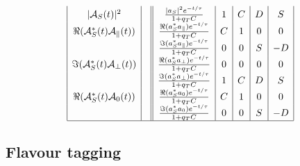 \documentclass[a4paper,9pt,twosided]{article}
\begin{document}
\begin{equation}
\begin{array}{| c |c|| c | c | c | c | c |}
|{\cal A}_S(t)|^2                             &                                                                &\frac{  | a_S |^2 e^{-t/\tau}}{1+q_TC}                  & 1 &   C  &   D &  S   \\
\Re({\cal A}_S^*(t){\cal A}_\parallel(t))     &                                                                &\frac{  \Re(a_S^*a_\parallel)e^{-t/\tau}}{1+q_TC}       & C &   1  &   0 &  0   \\
                                              &                                                                &\frac{  \Im(a_S^*a_\parallel)e^{-t/\tau}}{1+q_TC}       & 0 &   0  &   S & -D   \\
\Im({\cal A}_S^*(t){\cal A}_\perp(t))         &                                                                &\frac{  \Re(a_S^* a_\perp)e^{-t/\tau}}{1+q_TC}          & 0 &   0  &   0 &  0   \\                         
                                              &                                                                &\frac{  \Im(a_S^* a_\perp)e^{-t/\tau}}{1+q_TC}          & 1 &   C  &   D &  S   \\
\Re({\cal A}_S^*(t){\cal A}_0(t))             &                                                                &\frac{  \Re(a_S^* a_0)e^{-t/\tau}}{1+q_TC}              & C &   1  &   0 &  0   \\
                                              &                                                                &\frac{  \Im(a_S^* a_0)e^{-t/\tau}}{1+q_TC}              & 0 &   0  &   S & -D   \\
\hline
\end{array}
\end{equation}

\subsection{Flavour tagging}
\end{document}
